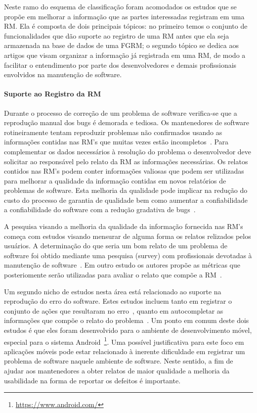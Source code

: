 Neste ramo do esquema de classificação foram acomodados os estudos que se propõe
em melhorar a informação que as partes interessadas registram em uma RM\@. Ela é
composta de dois principais tópicos: no primeiro temos o conjunto de
funcionalidades que dão suporte ao registro de uma RM antes que ela seja
armazenada na base de dados de uma FGRM\@; o segundo tópico se dedica aos artigos
que visam organizar a informação já registrada em uma RM, de modo a facilitar o
entendimento por parte dos desenvolvedores e demais profissionais envolvidos na
manutenção de software.

\paragraph{Suporte ao Registro da RM}

Durante o processo de correção de um problema de software verifica-se que a
reprodução manual dos bugs é demorada e tediosa. Os mantenedores de software
rotineiramente tentam reproduzir problemas não confirmados usando as informações
contidas nas RM's que muitas vezes estão
incompletos~\cite{White:2015:GRR:2820282.2820291}. Para complementar os dados
necessários à resolução do problema o desenvolvedor deve solicitar ao
responsável pelo relato da RM as informações necessárias. Os relatos
contidos nas RM's podem conter informações valiosas que podem ser
utilizadas para melhorar a qualidade da informação contidas em novos relatórios
de problemas de software. Esta melhoria da qualidade pode implicar na redução do
custo do processo de garantia de qualidade bem como aumentar a
confiabilidade a confiabilidade do software com a redução gradativa de
bugs~\cite{Tu:2014:MQI:2677832.2677844}.

A pesquisa visando a melhoria da qualidade da informação fornecida nas RM's
começa com estudos visando mensurar de alguma forma os relatos relizados pelos
usuários. A determinação do que seria um bom relato de um problema de software
foi obtido mediante uma pesquisa (survey) com profissionais devotadas à
manutenção de software~\cite{Bettenburg2008a}. Em outro estudo os autores propõe
as métricas que posteriomente serão utilizadas para avaliar o relato que compõe
a RM~\cite{Tu:2014:MQI:2677832.2677844}.

Um segundo nicho de estudos  nesta área está relacionado ao suporte na
reprodução do erro do software. Estes estudos incluem tanto em registrar o
conjunto de ações que resultaram no erro~\cite{White:2015:GRR:2820282.2820291},
quanto em autocompletar as informações que compõe o relato do
problema~\cite{moran2015auto}. Um ponto em comum deste dois estudos é que eles
foram desenvolvido para o ambiente de desenvolvimento móvel, especial para o
sistema Android~\footnote{\url{https://www.android.com/}}. Uma possível
justificativa para este foco em aplicações móveis pode estar relacionado à
inerente dificuldade em registrar um problema de software naquele ambiente de
software. Neste sentido, a fim de ajudar aos mantenedores a obter relatos de
maior qualidade a melhoria da usabilidade na forma de reportar os defeitos é
importante.

